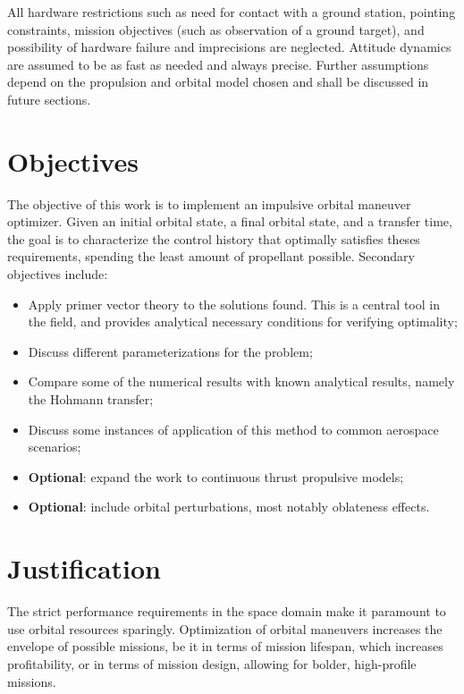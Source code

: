 All hardware restrictions such as need for contact with a ground station, pointing constraints, mission objectives (such as observation of a ground target), and possibility of hardware failure and imprecisions are neglected. Attitude dynamics are assumed to be as fast as needed and always precise. Further assumptions depend on the propulsion and orbital model chosen and shall be discussed in future sections.

\section{Objectives}

The objective of this work is to implement an impulsive orbital maneuver optimizer. Given an initial orbital state, a final orbital state, and a transfer time, the goal is to characterize the control history that optimally satisfies theses requirements, spending the least amount of propellant possible. Secondary objectives include:
\begin{itemize}
    \item Apply primer vector theory to the solutions found. This is a central tool in the field, and provides analytical necessary conditions for verifying optimality;
    \item Discuss different parameterizations for the problem;
    \item Compare some of the numerical results with known analytical results, namely the Hohmann transfer;
    \item Discuss some instances of application of this method to common aerospace scenarios;
    \item \textbf{Optional}: expand the work to continuous thrust propulsive models;
    \item \textbf{Optional}: include orbital perturbations, most notably oblateness effects.
\end{itemize}

\section{Justification}

The strict performance requirements in the space domain make it paramount to use orbital resources sparingly. Optimization of orbital maneuvers increases the envelope of possible missions, be it in terms of mission lifespan, which increases profitability, or in terms of mission design, allowing for bolder, high-profile missions. 

